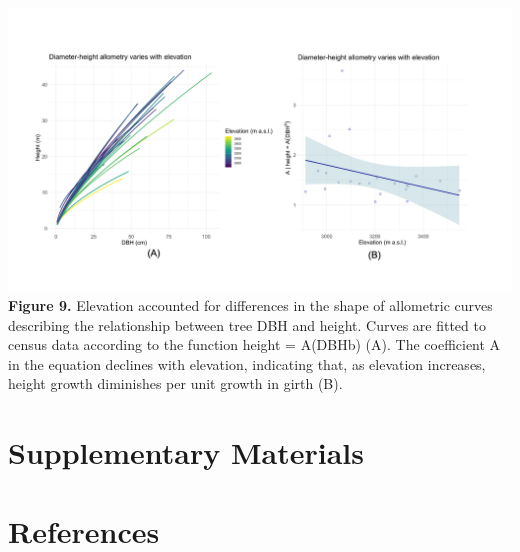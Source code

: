 \documentclass[
  12pt,
]{article}
\begin{document}
\includegraphics{./Figures/Fig9.png} \textbf{Figure 9.} Elevation
accounted for differences in the shape of allometric curves describing
the relationship between tree DBH and height. Curves are fitted to
census data according to the function height = A(DBHb) (A). The
coefficient A in the equation declines with elevation, indicating that,
as elevation increases, height growth diminishes per unit growth in
girth (B).

\clearpage

\hypertarget{supplementary-materials}{%
\section{Supplementary Materials}\label{supplementary-materials}}

\hypertarget{references}{%
\section*{References}\label{references}}
\end{document}
